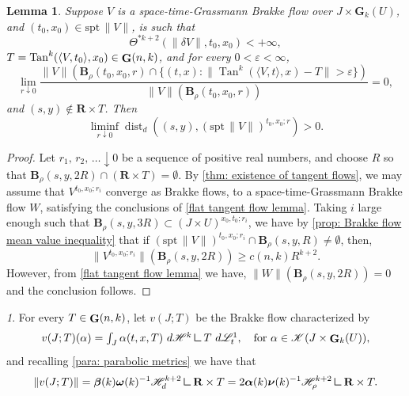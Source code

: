 \documentclass{article}
\theoremstyle{plain}
\theoremstyle{definition}
\theoremstyle{plain}
\newtheorem{lemma}[theorem]{Lemma}
\theoremstyle{remark}
\newtheorem{defparagraph}[theorem]{}
\theoremstyle{remark}
\theoremstyle{plain}
\newcommand{\weight}{\mathbin{\vrule height 1.6ex depth 0pt width
		0.14ex\vrule height 0.14ex depth 0pt width 1.3ex}}
\DeclareMathOperator{\Tan}{Tan}
\DeclareMathOperator{\G}{{\bf G}}
\DeclareMathOperator{\dist}{dist}
\begin{document}
\begin{lemma}\label{lem:convergence of blow up spt}
  Suppose $V$ is a space-time-Grassmann Brakke flow over $J\times \mathbf{G}_{k} (U)$, and $(t_0,x_0)\in \mathrm{spt} \, \| V \|$, is such that
  \begin{equation*}
      \Theta^{* k+2} (\| \delta V \|, t_{0}, x_{0}) < + \infty,
  \end{equation*}
  $T = \Tan^k(\langle V, t_{0} \rangle, x_0) \in \G(n,k)$, and for every $0<\varepsilon<\infty$,
  \[ \lim\limits_{r\downarrow 0} \frac{\|V\|(\mathbf B_{\rho}(t_{0},x_{0},r)\cap \{ (t, x) : \|\Tan^{k}(\langle V,t\rangle,x)-T\|>\varepsilon\})}{\|V\|(\mathbf B_{\rho}(t_{0}, x_{0}, r))} = 0,\]
  and $(s,y)\notin \mathbf R \times T$.
  Then 
  \[ \liminf\limits_{r\downarrow 0} \dist_{d}((s,y),(\mathrm{spt} \, \| V \|)^{t_0,x_0;r})> 0 .\]
\end{lemma}

\begin{proof}
Let $r_{1}, \, r_{2}, \, \ldots \downarrow 0$ be a sequence of positive real numbers, and choose $R$ so that 
$\mathbf B_{\rho}(s,y, 2R) \cap (\mathbf R \times T) = \emptyset$. 
By \ref{thm: existence of tangent flows}, we may assume that $V^{t_{0}, x_{0}; r_{i}}$ converge as Brakke flows, to a space-time-Grassmann Brakke flow $W$, satisfying the conclusions of \ref{flat tangent flow lemma}.
Taking $i$ large enough such that $\mathbf{B}_{\rho} (s, y,  3R) \subset (J \times U)^{x_{0}, t_{0}; r_{i}}$, we have by \ref{prop: Brakke flow mean value inequality} that if $(\mathrm{spt} \, \| V \|)^{t_{0}, x_{0}; r_{i}} \cap \mathbf{B}_{\rho} (s, y, R) \not= \emptyset$, then, 
\begin{equation*}
    \| V^{t_{0}, x_{0}; r_{i}} \| (\mathbf{B}_{\rho} (s, y,  2R)) \geq c (n, k) R^{k + 2}.
\end{equation*}
However, from \ref{flat tangent flow lemma} we have, $\| W \| (\mathbf{B}_{\rho} (s, y,  2R)) = 0$
and the conclusion follows.
\end{proof}

 \begin{defparagraph}\label{def: notation for static planar Brakke flow}
For every $T\in \G(n,k)$, let $v(J;T)$ be the Brakke flow characterized by 
     \[ v(J ; T) (\alpha) = \textstyle \int_J \alpha(t,x,T) \ d \mathscr H^k\weight T \ d \mathscr L^1_t, \quad \text{for $\alpha\in \mathscr K(J\times \G_k(U))$},\]
     and recalling \ref{para: parabolic metrics} we have that
     \begin{equation*}
          \| v (J; T) \| = \boldsymbol{\beta} (k) \boldsymbol{\omega} (k)^{-1} \mathscr{H}^{k + 2}_{d} \weight \mathbf{R} \times T = 2 \boldsymbol{\alpha} (k) \boldsymbol{\nu} (k)^{-1} \mathscr{H}^{k + 2}_{\rho} \weight \mathbf{R} \times T.
     \end{equation*}
 \end{defparagraph}
\end{document}

